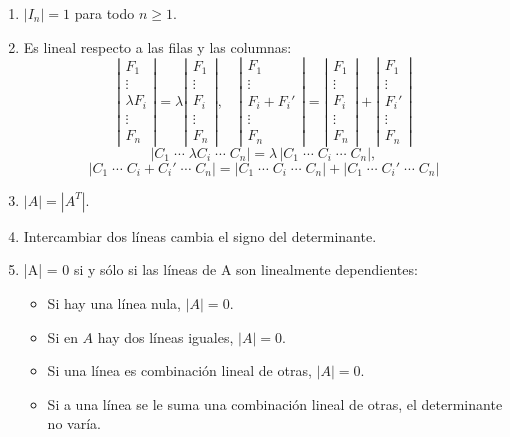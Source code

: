 \documentclass[a4paper,12pt]{article}
\begin{document}
\begin{procedimiento}[title=Propiedades del determinante]
\begin{enumerate}
    \item $|I_n| = 1$ para todo $n \ge 1$.
    \item Es lineal respecto a las filas y las columnas:  
    \[
    \left|
    \begin{matrix}
    F_1 \\
    \vdots \\
    \lambda F_i \\
    \vdots \\
    F_n
    \end{matrix}
    \right| = \lambda 
    \left|
    \begin{matrix}
    F_1 \\
    \vdots \\
    F_i \\
    \vdots \\
    F_n
    \end{matrix}
    \right|, 
    \quad
    \left|
    \begin{matrix}
    F_1 \\
    \vdots \\
    F_i + F_i' \\
    \vdots \\
    F_n
    \end{matrix}
    \right| =
    \left|
    \begin{matrix}
    F_1 \\
    \vdots \\
    F_i \\
    \vdots \\
    F_n
    \end{matrix}
    \right| +
    \left|
    \begin{matrix}
    F_1 \\
    \vdots \\
    F_i' \\
    \vdots \\
    F_n
    \end{matrix}
    \right|
    \]
    \[
    |C_1 \;\cdots\; \lambda C_i \;\cdots\; C_n| = \lambda \, |C_1 \;\cdots\; C_i \;\cdots\; C_n|, 
    \]
    \[
    |C_1 \;\cdots\; C_i + C_i' \;\cdots\; C_n| = |C_1 \;\cdots\; C_i \;\cdots\; C_n| + |C_1 \;\cdots\; C_i' \;\cdots\; C_n|
    \]
    \item $|A| = |A^T|$.
    \item Intercambiar dos líneas cambia el signo del determinante.
    \item |A| = 0 si y sólo si las líneas de A son linealmente dependientes:
    \begin{itemize}
        \item Si hay una línea nula, $|A| = 0$.
        \item Si en $A$ hay dos líneas iguales, $|A| = 0$.
        \item Si una línea es combinación lineal de otras, $|A| = 0$.
        \item Si a una línea se le suma una combinación lineal de otras, el determinante no varía.
    \end{itemize}


\end{enumerate}
\end{procedimiento}
\end{document}
